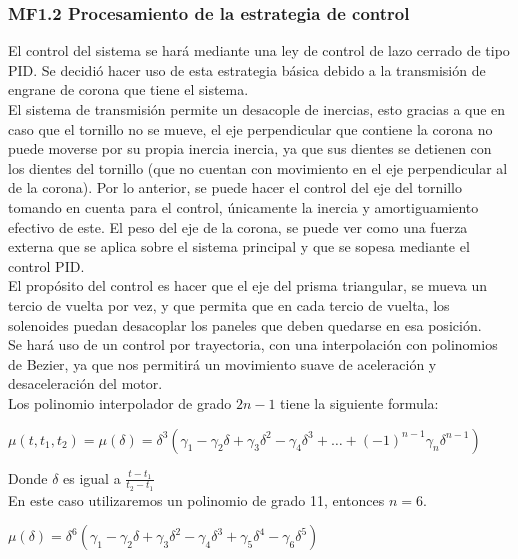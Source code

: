 \subsubsection{MF1.2 Procesamiento de la estrategia de control}

El control del sistema se hará mediante una ley de control de lazo cerrado de tipo PID. Se decidió hacer uso de esta estrategia básica debido a la transmisión de engrane de corona que tiene el sistema. \\
El sistema de transmisión permite un desacople de inercias, esto gracias a que en caso que el tornillo no se mueve, el eje perpendicular que contiene la corona no puede moverse por su propia inercia inercia, ya que sus dientes se detienen con los dientes del tornillo (que no cuentan con movimiento en el eje perpendicular al de la corona). Por lo anterior, se puede hacer el control del eje del tornillo tomando en cuenta para el control, únicamente la inercia y amortiguamiento efectivo de este. El peso del eje de la corona, se puede ver como una fuerza externa que se aplica sobre el sistema principal y que se sopesa mediante el control PID. \\
El propósito del control es hacer que el eje del prisma triangular, se mueva un tercio de vuelta por vez, y que permita que en cada tercio de vuelta, los solenoides puedan desacoplar los paneles que deben quedarse en esa posición. \\
Se hará uso de un control por trayectoria, con una interpolación con polinomios de Bezier, ya que nos permitirá un movimiento suave de aceleración y desaceleración del motor. \\
Los polinomio interpolador de grado $2n-1$ tiene la siguiente formula:

$\mu(t, t_1, t_2) = \mu(\delta) = \delta^{3}\left(\gamma_1 - \gamma_2\delta + \gamma_3\delta^{2} - \gamma_4\delta^{3} + \dots + \left(-1 \right)^{n-1}\gamma_n\delta^{n-1}  \right)$

Donde $\delta$ es igual a $\frac{t - t_1}{t_2 - t_1}$ \\
En este caso utilizaremos un polinomio de grado 11, entonces $n = 6$.

$\mu(\delta) = \delta^{6}\left(\gamma_1 - \gamma_2\delta + \gamma_3\delta^{2} - \gamma_4\delta^{3}+ \gamma_5\delta^{4} - \gamma_6\delta^{5} \right)$

